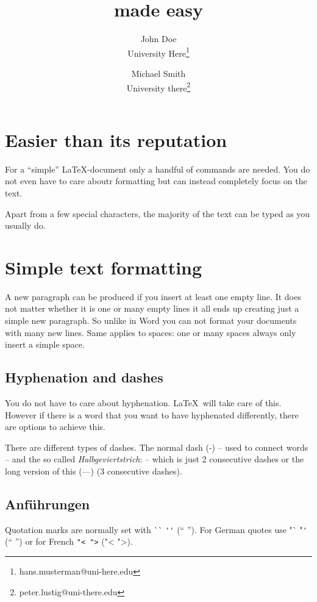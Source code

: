 \documentclass[11pt, a4paper]{article}
\title{\ltx{} made easy}
\author{John Doe\\ University Here\thanks{hans.musterman@uni-here.edu} \and Michael Smith\\University there\thanks{peter.lustig@uni-there.edu}}
\newcommand{\ltx}{\LaTeX}
\begin{document}
\maketitle
\tableofcontents
\newpage

\section{Easier than its reputation}

For a ``simple'' \ltx-document only a handful of commands are needed. You do not even have to care aboutr formatting but can instead completely focus on the text.

Apart from a few special characters, the majority of the text can be typed as you usually do.

\section{Simple text formatting}

A new paragraph can be produced if you insert at least one empty line. It does not matter whether it is one or many empty lines it all ends up creating just a simple new paragraph. So unlike in Word you can not format your documents with many new lines. Same applies to spaces: one or many spaces always only insert a simple space.

\subsection{Hyphenation and dashes}

You do not have to care about hyphenation. \ltx\ will take care of this. However if there is a word that you want to have hyphenated differently, there are options to achieve this.

There are different types of dashes. The normal dash (-) -- used to connect words -- and the so called \textit{Halbgeviertstrich}: -- which is just 2 consecutive dashes or the long version of this (---) (3 consecutive dashes).


\subsection{Anführungen}
Quotation marks are normally set with \`{}\`{} \verb+''+ (`` ''). For German quotes use "\`{} "\verb+'+ ("` "') or for French \verb+"< ">+ ("< ">).

\begingroup
\setlength{\parindent}{0pt}
\setlength{\parskip}{1.5ex plus 0.5ex minus 0.2ex}
\end{document}
